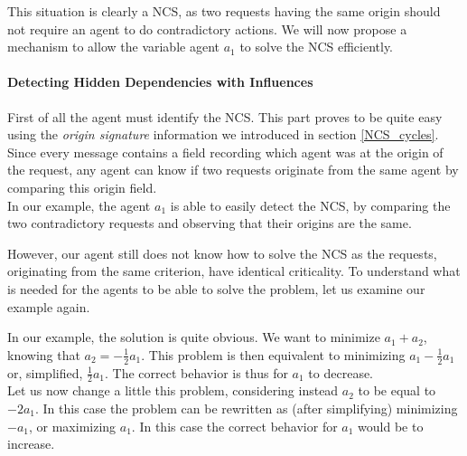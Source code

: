 This situation is clearly a NCS, as two requests having the same origin should not require an agent to do contradictory actions. We will now propose a mechanism to allow the variable agent $a_1$ to solve the NCS efficiently.

\paragraph*{Detecting Hidden Dependencies with Influences}
First of all the agent must identify the NCS. This part proves to be quite easy using the \emph{origin signature} information we introduced in section \ref{NCS_cycles}. Since every message contains a field recording which agent was at the origin of the request, any agent can know if two requests originate from the same agent by comparing this origin field.\\
In our example, the agent $a_1$ is able to easily detect the NCS, by comparing the two contradictory requests and observing that their origins are the same.

However, our agent still does not know how to solve the NCS as the requests, originating from the same criterion, have identical criticality. To understand what is needed for the agents to be able to solve the problem, let us examine our example again.

In our example, the solution is quite obvious. We want to minimize $a_1 + a_2$, knowing that $a_2 = -\frac{1}{2}a_1$. This problem is then equivalent to minimizing $a_1-\frac{1}{2}a_1$ or, simplified, $\frac{1}{2}a_1$. The correct behavior is thus for $a_1$ to decrease.\\
Let us now change a little this problem, considering instead $a_2$ to be equal to $ -2a_1$. In this case the problem can be rewritten as (after simplifying) minimizing $-a_1$, or maximizing $a_1$. In this case the correct behavior for $a_1$ would be to increase.

